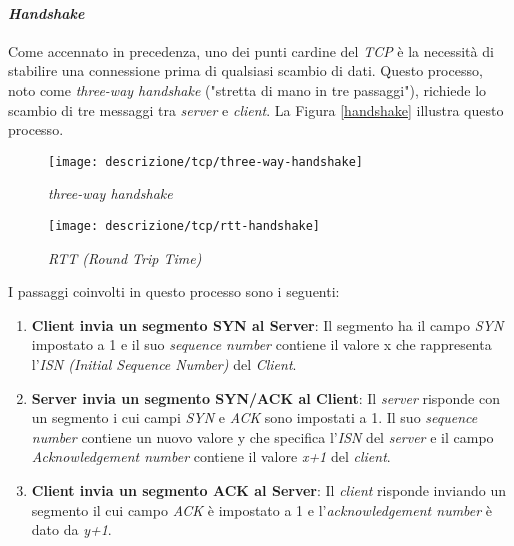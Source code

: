 \paragraph{\textit{Handshake}}

\noindent Come accennato in precedenza, uno dei punti cardine del \emph{TCP} è la necessità di stabilire una connessione prima di qualsiasi scambio di dati. Questo processo, noto come \emph{three-way handshake} ("stretta di mano in tre passaggi"), richiede lo scambio di tre messaggi tra \emph{server} e \emph{client}. La Figura \ref{handshake} illustra questo processo.

\begin{figure}[!h]
    \centering
    \begin{minipage}{0.48\textwidth}
        \centering
        \texttt{[image: descrizione/tcp/three-way-handshake]}
        \caption{\emph{three-way handshake}}
        \label{handshake}
    \end{minipage}
    \hfill
    \begin{minipage}{0.48\textwidth}
        \centering
        \texttt{[image: descrizione/tcp/rtt-handshake]}
        \caption{\emph{RTT (Round Trip Time)}}
        \label{rtt}
    \end{minipage}
\end{figure}

\noindent I passaggi coinvolti in questo processo sono i seguenti: 

\begin{enumerate}
    \item \textbf{Client invia un segmento SYN al Server}: Il segmento ha il campo \emph{SYN} impostato a 1 e il suo \emph{sequence number} contiene il valore x che rappresenta l'\emph{ISN (Initial Sequence Number)} del \emph{Client}.
    \item \textbf{Server invia un segmento SYN/ACK al Client}: Il \emph{server} risponde con un segmento i cui campi \emph{SYN} e \emph{ACK} sono impostati a 1. Il suo \emph{sequence number} contiene un nuovo valore y che specifica l'\emph{ISN} del \emph{server} e il campo \emph{Acknowledgement number} contiene il valore \emph{x+1} del \emph{client}.
    \item \textbf{Client invia un segmento ACK al Server}: Il \emph{client} risponde inviando un segmento il cui campo \emph{ACK} è impostato a 1 e l'\emph{acknowledgement number} è dato da \emph{y+1}.
\end{enumerate}

